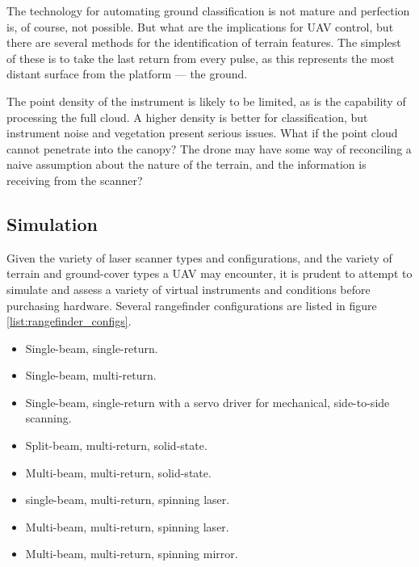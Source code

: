 \documentclass[10pt,a4paper]{report}
\begin{document}
The technology for automating ground classification is not mature \cite{Vosselman2001,Vosselman2000} and perfection is, of course, not possible. But what are the implications for UAV control, but there are several methods for the identification of terrain features. The simplest of these is to take the last return from every pulse, as this represents the most distant surface from the platform --- the ground.

The point density of the instrument is likely to be limited, as is the capability of processing the full cloud. A higher density is better for classification, but instrument noise and vegetation present serious issues. What if the point cloud cannot penetrate into the canopy? The drone may have some way of reconciling a naive assumption about the nature of the terrain, and the information is receiving from the scanner?


\subsection{Simulation}

Given the variety of laser scanner types and configurations, and the variety of terrain and ground-cover types a UAV may encounter, it is prudent to attempt to simulate and assess a variety of virtual instruments and conditions before purchasing hardware. Several rangefinder configurations are listed in figure \ref{list:rangefinder_configs}.

\begin{itemize}
\item Single-beam, single-return.
\item Single-beam, multi-return.
\item Single-beam, single-return with a servo driver for mechanical, side-to-side scanning.
\item Split-beam, multi-return, solid-state.
\item Multi-beam, multi-return, solid-state.
\item single-beam, multi-return, spinning laser.
\item Multi-beam, multi-return, spinning laser.
\item Multi-beam, multi-return, spinning mirror.
\label{list:rangefinder_configs}
\end{itemize}
\end{document}
